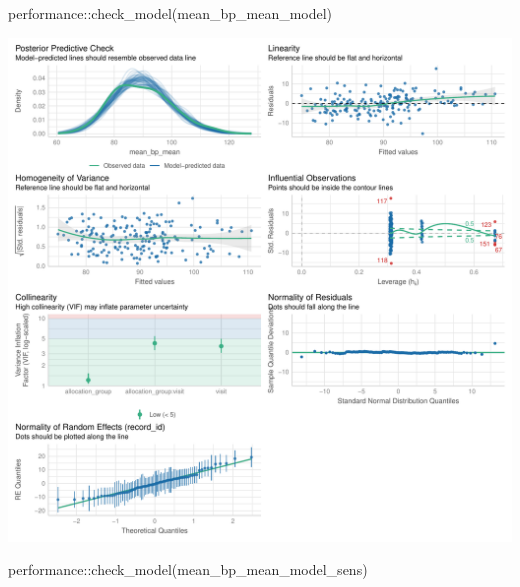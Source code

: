 \documentclass[
  letterpaper,
  DIV=11,
  numbers=noendperiod]{scrartcl}
\newenvironment{Shaded}{\begin{snugshade}}{\end{snugshade}}
\newcommand{\FunctionTok}[1]{\textcolor[rgb]{0.28,0.35,0.67}{#1}}
\newcommand{\NormalTok}[1]{\textcolor[rgb]{0.00,0.23,0.31}{#1}}
\newcommand{\SpecialCharTok}[1]{\textcolor[rgb]{0.37,0.37,0.37}{#1}}
\begin{document}
\begin{Shaded}
\begin{Highlighting}[]
\NormalTok{performance}\SpecialCharTok{::}\FunctionTok{check\_model}\NormalTok{(mean\_bp\_mean\_model)}
\end{Highlighting}
\end{Shaded}

\includegraphics{Outcomes_V1V2V3_files/figure-pdf/mean_bp_mean_4-1.pdf}

\begin{Shaded}
\begin{Highlighting}[]
\NormalTok{performance}\SpecialCharTok{::}\FunctionTok{check\_model}\NormalTok{(mean\_bp\_mean\_model\_sens)}
\end{Highlighting}
\end{Shaded}
\end{document}
